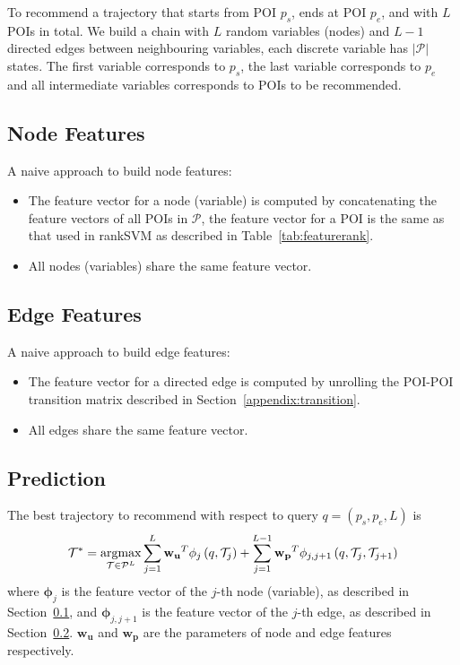To recommend a trajectory that starts from POI $p_s$, ends at POI $p_e$, and with $L$ POIs in total.
We build a chain with $L$ random variables (nodes) and $L-1$ directed edges between neighbouring variables,
each discrete variable has $|\mathcal{P}|$ states.
The first variable corresponds to $p_s$, the last variable corresponds to $p_e$ and
all intermediate variables corresponds to POIs to be recommended.


\subsection{Node Features}
\label{appendix:node}
A naive approach to build node features:
\begin{itemize}
\item The feature vector for a node (variable) is computed by concatenating the feature vectors of all POIs in $\mathcal{P}$, 
      the feature vector for a POI is the same as that used in rankSVM as described in Table~\ref{tab:featurerank}.
\item All nodes (variables) share the same feature vector.
\end{itemize}


\subsection{Edge Features}
\label{appendix:edge}
A naive approach to build edge features:
\begin{itemize}
\item The feature vector for a directed edge is computed by unrolling the POI-POI transition matrix 
      described in Section~\ref{appendix:transition}.
\item All edges share the same feature vector.
\end{itemize}


\subsection{Prediction}
The best trajectory to recommend with respect to query $q = (p_s, p_e, L)$ is
\begin{displaymath}
    \mathcal{T}^* = \operatorname*{argmax}_{\mathcal{T} \in \mathcal{P}^L} 
                    \sum_{j=1}^L \mathbf{w_u}^T \mathbf{\phi}_j \left( q, \mathcal{T}_j \right) +
                    \sum_{j=1}^{L-1} \mathbf{w_p}^T \mathbf{\phi}_{j, j+1} \left( q, \mathcal{T}_j, \mathcal{T}_{j+1} \right)
\end{displaymath}
where $\mathbf{\phi}_j$ is the feature vector of the $j$-th node (variable), as described in Section~\ref{appendix:node},
and $\mathbf{\phi}_{j, j+1}$ is the feature vector of the $j$-th edge, as described in Section~\ref{appendix:edge}.
$\mathbf{w_u}$ and $\mathbf{w_p}$ are the parameters of node and edge features respectively.


